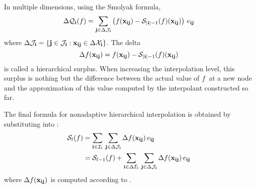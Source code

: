 In multiple dimensions, using the Smolyak formula,
\begin{equation} \elab{tensor-delta}
  \Delta\tensor{\vi}(\f) = \sum_{\vj \in \Delta\oindex_\vi} \left( \f(\vx_{\vi\vj}) - \smolyak{|\vi| - 1}(\f)(\vx_{\vi\vj}) \right) \, \e_{\vi\vj}
\end{equation}
where $\Delta\mathcal{J}_{\mathbf{i}} = \{ \mathbf{j} \in \mathcal{J}_{\mathbf{i}}: \mathbf{x}_{\mathbf{i}\mathbf{j}} \in
\Delta\mathcal{X}_{\mathbf{i}} \}$. The delta
\begin{equation} \elab{surplus}
  \surplus(\vx_{\vi\vj}) = \f(\vx_{\vi\vj}) - \smolyak{|\vi| - 1}(\f)(\vx_{\vi\vj})
\end{equation}
is called a hierarchical surplus. When increasing the interpolation level, this
surplus is nothing but the difference between the actual value of $f$ at a new
node and the approximation of this value computed by the interpolant constructed
so far.

The final formula for nonadaptive hierarchical interpolation is obtained by
substituting  into :
\begin{align}
  \smolyak{\l}(\f) &= \sum_{\vi \in \lindex_\l} \, \sum_{\vj \in \Delta\oindex_\vi} \surplus(\vx_{\vi\vj}) \, \e_{\vi\vj} \nonumber \\
                   &= \smolyak{\l-1}(\f) + \sum_{\vi \in \Delta\lindex_\l} \, \sum_{\vj \in \Delta\oindex_\vi} \surplus(\vx_{\vi\vj}) \, \e_{\vi\vj} \elab{smolyak-hierarchical}
\end{align}
where $\Delta f(\mathbf{x}_{\mathbf{i}\mathbf{j}})$ is computed according to .
